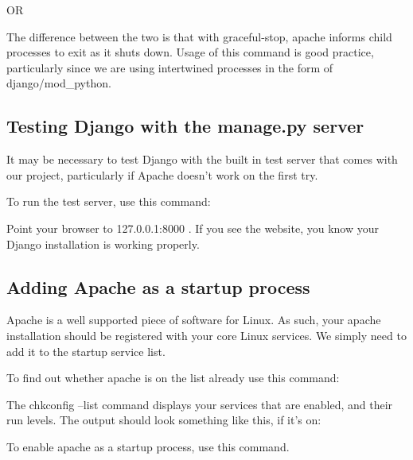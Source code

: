 
OR


The difference between the two is that with graceful-stop, apache informs child processes to exit as it shuts down.  Usage of this command is good practice, particularly since we are using intertwined processes in the form of django/mod\_python.

\subsection{Testing Django with the manage.py server}

It may be necessary to test Django with the built in test server that comes with our project, particularly if Apache doesn't work on the first try.  

To run the test server, use this command:


Point your browser to 127.0.0.1:8000 . If you see the website, you know your Django installation is working properly.

\subsection{Adding Apache as a startup process}

Apache is a well supported piece of software for Linux.  As such, your apache installation should be registered with your core Linux services.  We simply need to add it to the startup service list.

To find out whether apache is on the list already use this command:


\vspace{1pc}

The chkconfig --list command displays your services that are enabled, and their run levels.  The output should look something like this, if it's on:


\vspace{1pc}

To enable apache as a startup process, use this command.


